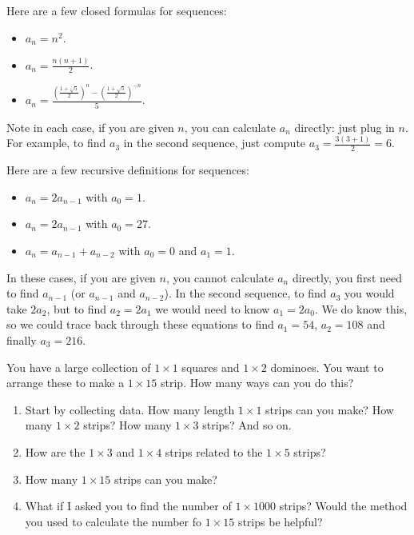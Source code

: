 \documentclass[11pt,]{book}
\theoremstyle{ptxplainnotitle}
\theoremstyle{ptxplaintitle}
\theoremstyle{ptxdefinitionnotitle}
\theoremstyle{ptxdefinitiontitle}
\theoremstyle{ptxdefinitionnotitle}
\theoremstyle{ptxdefinitiontitle}
\theoremstyle{ptxdefinitionnotitle}
\theoremstyle{ptxdefinitiontitle}
\theoremstyle{ptxdefinitiontitlenonumber}
\theoremstyle{ptxdefinitiontitlenonumber}
\numberwithin{equation}{chapter}
\renewcommand{\d}{\displaystyle}
\begin{document}
\begin{example}\label{example-2}
\hypertarget{p-42}{}%
Here are a few closed formulas for sequences: \leavevmode%
\begin{itemize}[label=\textbullet]
\item{}\(a_n = n^2\).%
\item{}\(\d a_n = \frac{n(n+1)}{2}\).%
\item{}\(\d a_n = \frac{\left(\frac{1 + \sqrt 5}{2}\right)^n - \left(\frac{1 + \sqrt 5}{2}\right)^{-n}}{5}\).%
\end{itemize}
%
\par
\hypertarget{p-43}{}%
Note in each case, if you are given \(n\), you can calculate \(a_n\) directly: just plug in \(n\).  For example, to find \(a_3\) in the second sequence, just compute \(a_3 = \frac{3(3+1)}{2} = 6\).%
\par
\hypertarget{p-44}{}%
Here are a few recursive definitions for sequences: \leavevmode%
\begin{itemize}[label=\textbullet]
\item{}\(a_n = 2a_{n-1}\) with \(a_0 = 1\).%
\item{}\(a_n = 2a_{n-1}\) with \(a_0 = 27\).%
\item{}\(a_n = a_{n-1} + a_{n-2}\) with \(a_0 = 0\) and \(a_1 = 1\).%
\end{itemize}
%
\par
\hypertarget{p-45}{}%
In these cases, if you are given \(n\), you cannot calculate \(a_n\) directly, you first need to find \(a_{n-1}\) (or \(a_{n-1}\) and \(a_{n-2}\)). In the second sequence, to find \(a_3\) you would take \(2a_2\), but to find \(a_2 = 2a_1\) we would need to know \(a_1 = 2a_0\).  We do know this, so we could trace back through these equations to find \(a_1 = 54\), \(a_2 = 108\) and finally \(a_3 = 216\).%
\end{example}
\begin{investigation}\label{investigation-3}
\hypertarget{p-46}{}%
You have a large collection of \(1\times 1\) squares and \(1\times 2\) dominoes. You want to arrange these to make a \(1 \times 15\) strip. How many ways can you do this? %
\begin{enumerate}
\item\hypertarget{li-30}{}\hypertarget{p-47}{}%
Start by collecting data. How many length \(1\times 1\) strips can you make? How many \(1\times 2\) strips? How many \(1\times 3\) strips? And so on.%
\item\hypertarget{li-31}{}\hypertarget{p-48}{}%
How are the \(1\times 3\) and \(1 \times 4\) strips related to the \(1\times 5\) strips?%
\item\hypertarget{li-32}{}\hypertarget{p-49}{}%
How many \(1\times 15\) strips can you make?%
\item\hypertarget{li-33}{}\hypertarget{p-50}{}%
What if I asked you to find the number of \(1\times 1000\) strips? Would the method you used to calculate the number fo \(1 \times 15\) strips be helpful?%
\end{enumerate}
%
\end{investigation}
\end{document}
